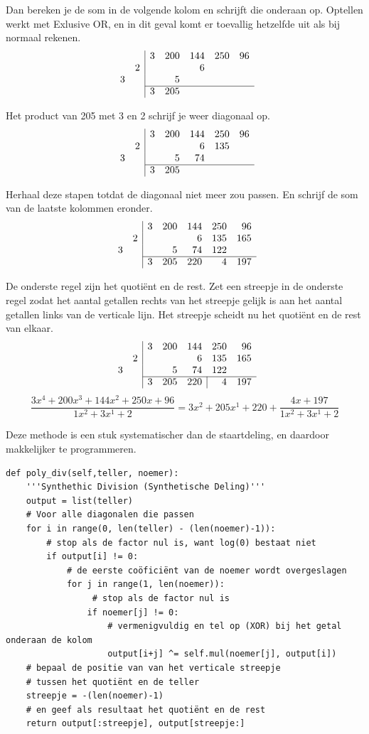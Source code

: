 \documentclass[a4paper]{article}
\begin{document}
Dan bereken je de som in de volgende kolom en schrijft die onderaan op. Optellen werkt met Exlusive OR, en in dit geval komt er toevallig hetzelfde uit als bij normaal rekenen.
\[\begin{array}{rr|rrrrr}
&&3&200&144&250&96\\
&2&&&6\\
3&&&5\\\cline{3-7}
&&3&205
\end{array}\]

Het product van 205 met 3 en 2 schrijf je weer diagonaal op.
\[\begin{array}{rr|rrrrr}
&&3&200&144&250&96\\
&2&&&6&135\\
3&&&5&74\\\cline{3-7}
&&3&205
\end{array}\]

Herhaal deze stapen totdat de diagonaal niet meer zou passen. En schrijf de som van de laatste kolommen eronder.
\[\begin{array}{rr|rrrrr}
&&3&200&144&250&96\\
&2&&&6&135&165\\
3&&&5&74&122\\\cline{3-7}
&&3&205&220&4&197
\end{array}\]

De onderste regel zijn het quotiënt en de rest. Zet een streepje in de onderste regel zodat het aantal getallen rechts van het streepje gelijk is aan het aantal getallen links van de verticale lijn. Het streepje scheidt nu het quotiënt en de rest van elkaar.
\[\begin{array}{rr|rrrrr}
&&3&200&144&250&96\\
&2&&&6&135&165\\
3&&&5&74&122\\\cline{3-7}
&&3&205&\multicolumn{1}{r|}{220}&4&197
\end{array}\]
$$\frac{
3x^4+200x^3+144x^2+250x+96
}{
1x^2 + 3x^1 + 2
} = 3x^2 + 205x^1 + 220 + \frac{4x+197}{1x^2 + 3x^1 + 2}
$$

Deze methode is een stuk systematischer dan de staartdeling, en daardoor makkelijker te programmeren.
\begin{verbatim}
def poly_div(self,teller, noemer):
    '''Synthethic Division (Synthetische Deling)'''
    output = list(teller)
    # Voor alle diagonalen die passen
    for i in range(0, len(teller) - (len(noemer)-1)):
        # stop als de factor nul is, want log(0) bestaat niet
        if output[i] != 0:
            # de eerste coöficiënt van de noemer wordt overgeslagen
            for j in range(1, len(noemer)):
                 # stop als de factor nul is
                if noemer[j] != 0:
                    # vermenigvuldig en tel op (XOR) bij het getal onderaan de kolom
                    output[i+j] ^= self.mul(noemer[j], output[i])
    # bepaal de positie van van het verticale streepje
    # tussen het quotiënt en de teller
    streepje = -(len(noemer)-1)
    # en geef als resultaat het quotiënt en de rest
    return output[:streepje], output[streepje:]
\end{verbatim}
\end{document}
